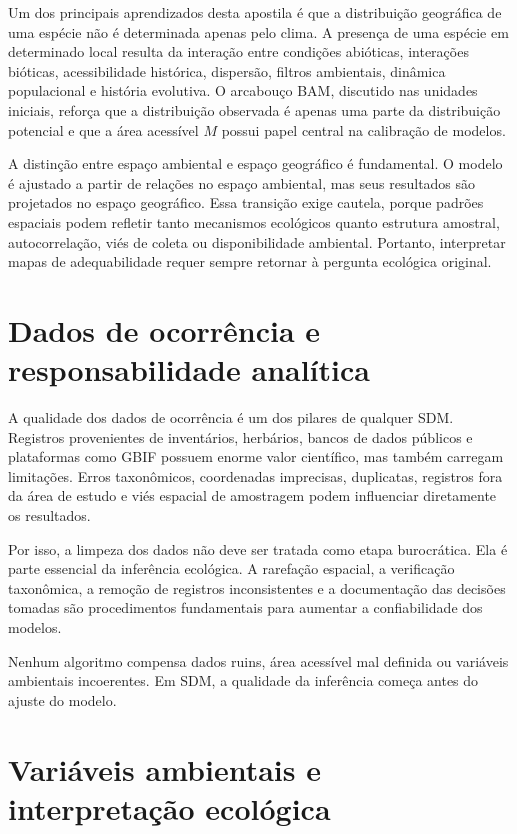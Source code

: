 \documentclass{ueap-sdm}
\begin{document}
Um dos principais aprendizados desta apostila é que a distribuição geográfica de uma espécie não é determinada apenas pelo clima. A presença de uma espécie em determinado local resulta da interação entre condições abióticas, interações bióticas, acessibilidade histórica, dispersão, filtros ambientais, dinâmica populacional e história evolutiva. O arcabouço BAM, discutido nas unidades iniciais, reforça que a distribuição observada é apenas uma parte da distribuição potencial e que a área acessível \(M\) possui papel central na calibração de modelos.

A distinção entre espaço ambiental e espaço geográfico é fundamental. O modelo é ajustado a partir de relações no espaço ambiental, mas seus resultados são projetados no espaço geográfico. Essa transição exige cautela, porque padrões espaciais podem refletir tanto mecanismos ecológicos quanto estrutura amostral, autocorrelação, viés de coleta ou disponibilidade ambiental. Portanto, interpretar mapas de adequabilidade requer sempre retornar à pergunta ecológica original.

\section{Dados de ocorrência e responsabilidade analítica}

A qualidade dos dados de ocorrência é um dos pilares de qualquer SDM. Registros provenientes de inventários, herbários, bancos de dados públicos e plataformas como GBIF possuem enorme valor científico, mas também carregam limitações. Erros taxonômicos, coordenadas imprecisas, duplicatas, registros fora da área de estudo e viés espacial de amostragem podem influenciar diretamente os resultados.

Por isso, a limpeza dos dados não deve ser tratada como etapa burocrática. Ela é parte essencial da inferência ecológica. A rarefação espacial, a verificação taxonômica, a remoção de registros inconsistentes e a documentação das decisões tomadas são procedimentos fundamentais para aumentar a confiabilidade dos modelos.

\begin{atencao}[title={\faExclamationTriangle\quad Dados bons antes de modelos complexos}]
	Nenhum algoritmo compensa dados ruins, área acessível mal definida ou variáveis ambientais incoerentes. Em SDM, a qualidade da inferência começa antes do ajuste do modelo.
\end{atencao}

\section{Variáveis ambientais e interpretação ecológica}
\end{document}
